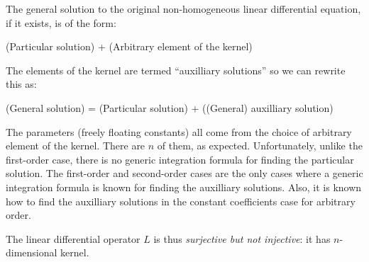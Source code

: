 \documentclass[10pt]{amsart}
\begin{document}
The general solution to the original non-homogeneous linear differential
equation, if it exists, is of the form:

(Particular solution) + (Arbitrary element of the kernel)

The elements of the kernel are termed ``auxilliary solutions'' so we
can rewrite this as:

(General solution) = (Particular solution) + ((General) auxilliary solution)

The parameters (freely floating constants) all come from the choice of
arbitrary element of the kernel. There are $n$ of them, as
expected. Unfortunately, unlike the first-order case, there is no
generic integration formula for finding the particular solution. The
first-order and second-order cases are the only cases where a generic
integration formula is known for finding the auxilliary
solutions. Also, it is known how to find the auxilliary solutions in
the constant coefficients case for arbitrary order.

The linear differential operator $L$ is thus {\em surjective but not
injective}: it has $n$-dimensional kernel.
\end{document}
